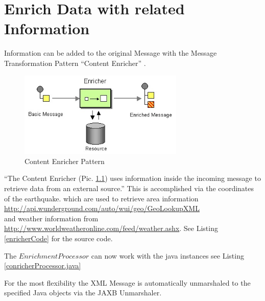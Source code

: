 \documentclass[11pt,english,ngerman, headsepline]{scrreprt}
\begin{document}



\chapter{Enrich Data with related Information}
Information can be
added to the original Message with the Message Transformation Pattern ``Content
Enricher'' .

  \begin{figure}[h!]
	\begin{center}
	\includegraphics[width=0.7\textwidth]{pics/DataEnricher.jpg}
	\end{center}
	\caption{Content Enricher Pattern \cite{hohpe2003enterprise}}
	\label{contentEnricherPic} 
   \end{figure}

``The Content Enricher (Pic. \ref{contentEnricherPic}) uses information inside
the incoming message to retrieve data from an external
source.\cite{hohpe2003enterprise}''
This is accomplished via the coordinates of the earthquake. which are used to
retrieve area information \\
\url{http://api.wunderground.com/auto/wui/geo/GeoLookupXML} \\and weather
information from \url{http://www.worldweatheronline.com/feed/weather.ashx}.
See Listing \ref{enricherCode} for the source code.



The $EnrichmentProcessor$ can now work with the java instances see Listing
\ref{conricherProcessor.java}







For the most flexibility the XML Message is automatically unmarshaled to the
specified Java objects via the JAXB Unmarshaler. 
\end{document}
